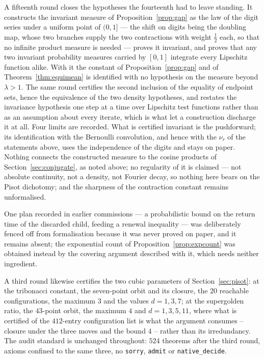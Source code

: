 \documentclass[11pt,reqno]{amsart}
\theoremstyle{plain}
\theoremstyle{definition}
\theoremstyle{remark}
\begin{document}
A fifteenth round closes the hypotheses the fourteenth had to leave standing.
It constructs the invariant measure of Proposition~\ref{prop:gap} as the law of
the digit series under a uniform point of $(0,1]$ --- the shift on digits being
the doubling map, whose two branches supply the two contractions with weight
$\tfrac12$ each, so that no infinite product measure is needed --- proves it
invariant, and proves that any two invariant probability measures carried by
$[0,1]$ integrate every Lipschitz function alike. With it the constant of
Proposition~\ref{prop:gap} and of
Theorem~\ref{thm:equimean} is identified with no hypothesis on the measure
beyond $\lambda>1$. The same round certifies the second inclusion of the equality of
endpoint sets, hence the equivalence of the two density hypotheses, and
restates the invariance hypothesis one step at a time over Lipschitz test
functions rather than as an assumption about every iterate, which is what let a
construction discharge it at all. Four limits are recorded. What is certified
invariant is the pushforward; its identification with the Bernoulli
convolution, and hence with the $\nu_r$ of the statements above, uses the
independence of the digits and stays on paper. Nothing connects the constructed
measure to the cosine products of
Section~\ref{sec:conjugate}, as noted above; no regularity of it is claimed ---
not absolute continuity, not a density, not Fourier decay, so nothing here
bears on the Pisot dichotomy; and the sharpness of the contraction constant
remains unformalised.

One plan recorded in earlier commissions --- a probabilistic bound on the
return time of the discarded child, feeding a renewal inequality --- was
deliberately fenced off from formalisation because it was never proved on
paper, and it remains absent; the exponential count of
Proposition~\ref{prop:expcount} was obtained instead by the covering argument
described with it, which needs neither ingredient.

A third round likewise certifies the two cubic parameters of
Section~\ref{sec:pisot}: at the tribonacci constant, the seven-point orbit and
its closure, the $20$ reachable configurations, the maximum $3$ and the values
$d=1,3,7$; at the supergolden ratio, the $43$-point orbit, the maximum $4$ and
$d=1,3,5,11$, where what is certified of the $412$-entry configuration list is
what the argument consumes -- closure under the three moves and the bound
$4$ -- rather than its irredundancy. The audit standard is unchanged
throughout: $524$ theorems after the third round, axioms confined to the same
three, no \texttt{sorry}, \texttt{admit} or \texttt{native\_decide}.
\end{document}

